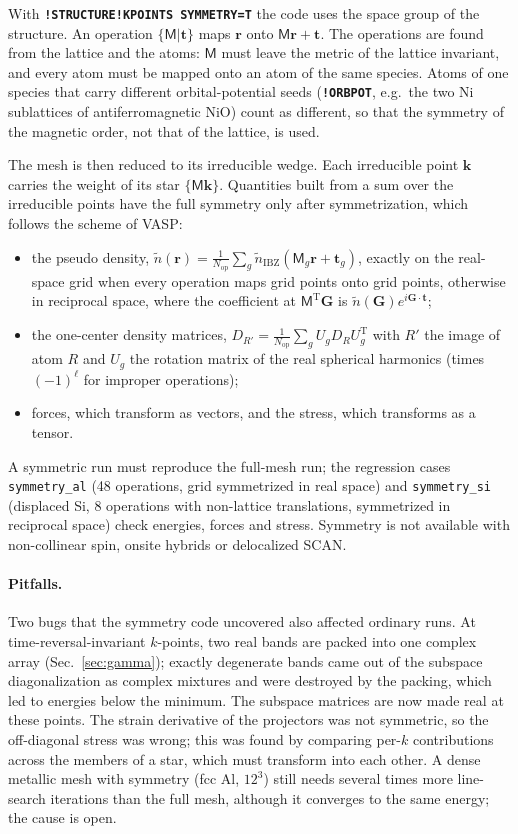 \documentclass[11pt,a4paper,oneside]{book}
\newcommand{\key}[1]{\textbf{\texttt{#1}}}
\begin{document}
With \key{!STRUCTURE!KPOINTS SYMMETRY=T} the code uses the space group of
the structure. An operation $\{\mathsf M|\bm t\}$ maps $\bm r$ onto
$\mathsf M\bm r+\bm t$. The operations are found from the lattice and the
atoms: $\mathsf M$ must leave the metric of the lattice invariant, and
every atom must be mapped onto an atom of the same species. Atoms of one
species that carry different orbital-potential seeds
(\key{!ORBPOT}, e.g.\ the two Ni sublattices of antiferromagnetic NiO)
count as different, so that the symmetry of the magnetic order, not that
of the lattice, is used.

The mesh is then reduced to its irreducible wedge. Each irreducible point
$\bm k$ carries the weight of its star $\{\mathsf M\bm k\}$. Quantities
built from a sum over the irreducible points have the full symmetry only
after symmetrization, which follows the scheme of VASP:
\begin{itemize}
\item the pseudo density, $\tilde n(\bm r)=\frac1{N_{\mathrm{op}}}\sum_g
  \tilde n_{\mathrm{IBZ}}(\mathsf M_g\bm r+\bm t_g)$, exactly on the
  real-space grid when every operation maps grid points onto grid
  points, otherwise in reciprocal space, where the coefficient at
  $\mathsf M^{\mathrm T}\bm G$ is $\tilde n(\bm G)e^{i\bm G\cdot\bm t}$;
\item the one-center density matrices,
  $D_{R'}=\frac1{N_{\mathrm{op}}}\sum_g U_g D_R U_g^{\mathrm T}$ with $R'$
  the image of atom $R$ and $U_g$ the rotation matrix of the real
  spherical harmonics (times $(-1)^\ell$ for improper operations);
\item forces, which transform as vectors, and the stress, which transforms
  as a tensor.
\end{itemize}
A symmetric run must reproduce the full-mesh run; the regression cases
\texttt{symmetry\_al} (48 operations, grid symmetrized in real space) and
\texttt{symmetry\_si} (displaced Si, 8 operations with non-lattice
translations, symmetrized in reciprocal space) check energies, forces and
stress. Symmetry is not available with non-collinear spin, onsite
hybrids or delocalized SCAN.

\paragraph{Pitfalls.} Two bugs that the symmetry code uncovered also
affected ordinary runs. At time-reversal-invariant $k$-points, two real
bands are packed into one complex array (Sec.~\ref{sec:gamma}); exactly
degenerate bands came out of the subspace diagonalization as complex
mixtures and were destroyed by the packing, which led to energies below
the minimum. The subspace matrices are now made real at these points.
The strain derivative of the projectors was not symmetric, so the
off-diagonal stress was wrong; this was found by comparing per-$k$
contributions across the members of a star, which must transform into
each other. A dense metallic mesh with symmetry (fcc Al, $12^3$) still
needs several times more line-search iterations than the full mesh,
although it converges to the same energy; the cause is open.
\end{document}
